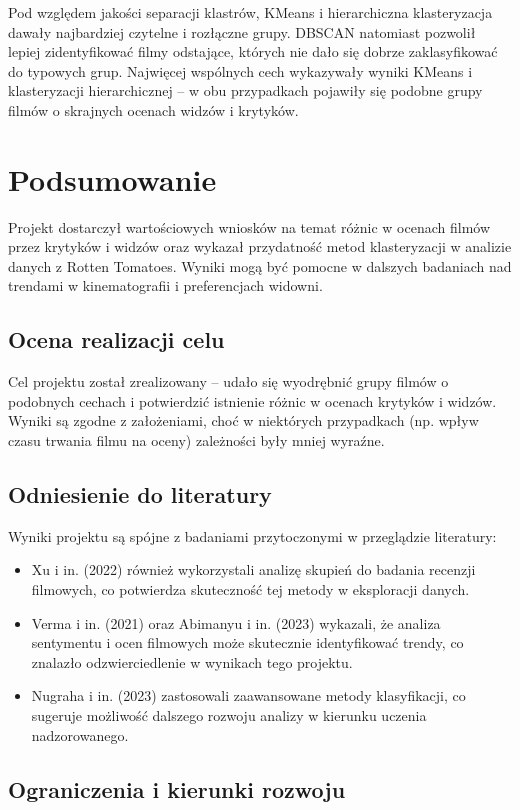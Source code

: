 \documentclass[a4paper,12pt,titlepage]{article}
\begin{document}
Pod względem jakości separacji klastrów, KMeans i hierarchiczna klasteryzacja dawały najbardziej czytelne i rozłączne grupy. DBSCAN natomiast pozwolił lepiej zidentyfikować filmy odstające, których nie dało się dobrze zaklasyfikować do typowych grup. Najwięcej wspólnych cech wykazywały wyniki KMeans i klasteryzacji hierarchicznej – w obu przypadkach pojawiły się podobne grupy filmów o skrajnych ocenach widzów i krytyków.


\section{Podsumowanie}
Projekt dostarczył wartościowych wniosków na temat różnic w ocenach filmów przez krytyków i widzów oraz wykazał przydatność metod klasteryzacji w analizie danych z Rotten Tomatoes. Wyniki mogą być pomocne w dalszych badaniach nad trendami w kinematografii i preferencjach widowni.

\subsection{Ocena realizacji celu}
Cel projektu został zrealizowany – udało się wyodrębnić grupy filmów o podobnych cechach i potwierdzić istnienie różnic w ocenach krytyków i widzów. Wyniki są zgodne z założeniami, choć w niektórych przypadkach (np. wpływ czasu trwania filmu na oceny) zależności były mniej wyraźne.

\subsection{Odniesienie do literatury}
Wyniki projektu są spójne z badaniami przytoczonymi w przeglądzie literatury:
\begin{itemize}
    \item Xu i in. (2022) również wykorzystali analizę skupień do badania recenzji filmowych, co potwierdza skuteczność tej metody w eksploracji danych.
    \item Verma i in. (2021) oraz Abimanyu i in. (2023) wykazali, że analiza sentymentu i ocen filmowych może skutecznie identyfikować trendy, co znalazło odzwierciedlenie w wynikach tego projektu.
    \item Nugraha i in. (2023) zastosowali zaawansowane metody klasyfikacji, co sugeruje możliwość dalszego rozwoju analizy w kierunku uczenia nadzorowanego.
\end{itemize}

\subsection{Ograniczenia i kierunki rozwoju}
\end{document}
